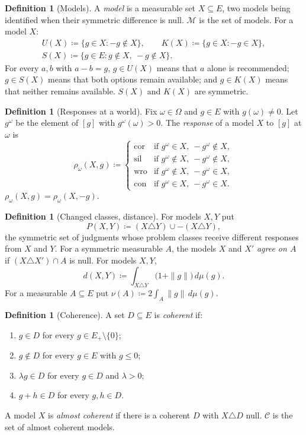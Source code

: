 \documentclass[11pt]{article}
\theoremstyle{definition}
\newtheorem{definition}[theorem]{Definition}
\newcommand{\M}{\mathcal M}
\newcommand{\C}{\mathcal C}
\newcommand{\cor}{\mathrm{cor}}
\newcommand{\sil}{\mathrm{sil}}
\newcommand{\wro}{\mathrm{wro}}
\newcommand{\con}{\mathrm{con}}
\begin{document}
\begin{definition}[Models]\label{def:models}
A \emph{model} is a measurable set $X\subseteq E$, two models being identified when their symmetric difference is null. $\M$ is the set of models. For a model $X$:
\begin{gather*}
U(X)\coloneqq\{g\in X:-g\notin X\},\qquad K(X)\coloneqq\{g\in X:-g\in X\},\\
S(X)\coloneqq\{g\in E:g\notin X,\ -g\notin X\}.
\end{gather*}
For every $a,b$ with $a-b=g$, $g\in U(X)$ means that $a$ alone is recommended; $g\in S(X)$ means that both options remain available; and $g\in K(X)$ means that neither remains available. $S(X)$ and $K(X)$ are symmetric.
\end{definition}

\begin{definition}[Responses at a world]\label{def:responses}
Fix $\omega\in\Omega$ and $g\in E$ with $g(\omega)\ne0$. Let $g^\omega$ be the element of $[g]$ with $g^\omega(\omega)>0$. The \emph{response} of a model $X$ to $[g]$ at $\omega$ is
\[
\rho_\omega(X,g)\coloneqq
\begin{cases}
\cor &\text{if } g^\omega\in X,\ -g^\omega\notin X,\\
\sil &\text{if } g^\omega\notin X,\ -g^\omega\notin X,\\
\wro &\text{if } g^\omega\notin X,\ -g^\omega\in X,\\
\con &\text{if } g^\omega\in X,\ -g^\omega\in X.
\end{cases}
\]
$\rho_\omega(X,g)=\rho_\omega(X,-g)$. 
\end{definition}

\begin{definition}[Changed classes, distance]\label{def:changed}
For models $X,Y$ put
\[
P(X,Y)\coloneqq (X\triangle Y)\cup -(X\triangle Y),
\]
the symmetric set of judgments whose problem classes receive different responses from $X$ and $Y$. For a symmetric measurable $A$, the models $X$ and $X'$ \emph{agree on $A$} if $(X\triangle X')\cap A$ is null. For models $X,Y$,
\[
d(X,Y)\coloneqq\int_{X\triangle Y}\bigl(1+\|g\|\bigr)\,d\mu(g).
\]
For a measurable $A\subseteq E$ put $\nu(A)\coloneqq2\int_A\|g\|\,d\mu(g)$.
\end{definition}

\begin{definition}[Coherence]\label{def:coherence}
A set $D\subseteq E$ is \emph{coherent} if:
\begin{enumerate}[label=(C\arabic*)]
\item $g\in D$ for every $g\in E_+\setminus\{0\}$;
\item $g\notin D$ for every $g\in E$ with $g\le0$;
\item $\lambda g\in D$ for every $g\in D$ and $\lambda>0$;
\item $g+h\in D$ for every $g,h\in D$.
\end{enumerate}
A model $X$ is \emph{almost coherent} if there is a coherent $D$ with $X\triangle D$ null. $\C$ is the set of almost coherent models.
\end{definition}
\end{document}
